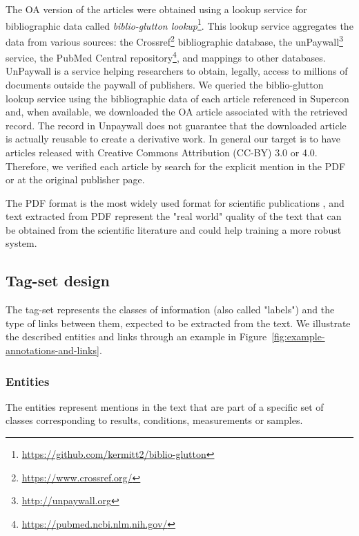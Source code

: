 \documentclass[fleqn,10pt]{wlscirep}
\begin{document}
The OA version of the articles were obtained using a lookup service for bibliographic data called \textit{biblio-glutton lookup}\footnote{\url{https://github.com/kermitt2/biblio-glutton}}. This lookup service aggregates the data from various sources: the Crossref\footnote{\url{https://www.crossref.org/}} bibliographic database, the unPaywall\footnote{\url{http://unpaywall.org}} service, the PubMed Central repository\footnote{\url{https://pubmed.ncbi.nlm.nih.gov/}}, and mappings to other databases. 
UnPaywall is a service helping researchers to obtain, legally, access to millions of documents outside the paywall of publishers. 
We queried the biblio-glutton lookup service using the bibliographic data of each article referenced in Supercon and, when available, we downloaded the OA article associated with the retrieved record. 
The record in Unpaywall does not guarantee that the downloaded article is actually reusable to create a derivative work. 
In general our target is to have articles released with Creative Commons Attribution (CC-BY) 3.0 or 4.0. 
Therefore, we verified each article by search for the explicit mention in the PDF or at the original publisher page. 

The PDF format is the most widely used format for scientific publications \cite{johnson2018pdfStatistics}, and text extracted from PDF represent the "real world" quality of the text that can be obtained from the scientific literature and could help training a more robust system.

\subsection*{Tag-set design}
The tag-set represents the classes of information (also called "labels") and the type of links between them, expected to be extracted from the text. We illustrate the described entities and links through an example in Figure~\ref{fig:example-annotations-and-links}.

\subsubsection*{Entities}
The entities represent mentions in the text that are part of a specific set of classes corresponding to results, conditions, measurements or samples.
\end{document}
